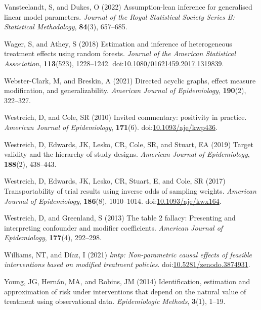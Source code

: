 \documentclass[
  single column]{article}
\newlength{\cslhangindent}
\newenvironment{CSLReferences}[2] %
 {\begin{list}{}{%
  \setlength{\itemindent}{0pt}
  \setlength{\leftmargin}{0pt}
  \setlength{\parsep}{0pt}
  \ifodd #1
   \setlength{\leftmargin}{\cslhangindent}
   \setlength{\itemindent}{-1\cslhangindent}
  \fi
  \setlength{\itemsep}{#2\baselineskip}}}
 {\end{list}}
\begin{document}
\begin{CSLReferences}{1}{0}
Vansteelandt, S, and Dukes, O (2022) Assumption-lean inference for
generalised linear model parameters. \emph{Journal of the Royal
Statistical Society Series B: Statistical Methodology}, \textbf{84}(3),
657--685.

Wager, S, and Athey, S (2018) Estimation and inference of heterogeneous
treatment effects using random forests. \emph{Journal of the American
Statistical Association}, \textbf{113}(523), 1228--1242.
doi:\href{https://doi.org/10.1080/01621459.2017.1319839}{10.1080/01621459.2017.1319839}.

Webster-Clark, M, and Breskin, A (2021) Directed acyclic graphs, effect
measure modification, and generalizability. \emph{American Journal of
Epidemiology}, \textbf{190}(2), 322--327.

Westreich, D, and Cole, SR (2010) Invited commentary: positivity in
practice. \emph{American Journal of Epidemiology}, \textbf{171}(6).
doi:\href{https://doi.org/10.1093/aje/kwp436}{10.1093/aje/kwp436}.

Westreich, D, Edwards, JK, Lesko, CR, Cole, SR, and Stuart, EA (2019)
Target validity and the hierarchy of study designs. \emph{American
Journal of Epidemiology}, \textbf{188}(2), 438--443.

Westreich, D, Edwards, JK, Lesko, CR, Stuart, E, and Cole, SR (2017)
Transportability of trial results using inverse odds of sampling
weights. \emph{American Journal of Epidemiology}, \textbf{186}(8),
1010--1014.
doi:\href{https://doi.org/10.1093/aje/kwx164}{10.1093/aje/kwx164}.

Westreich, D, and Greenland, S (2013) The table 2 fallacy: Presenting
and interpreting confounder and modifier coefficients. \emph{American
Journal of Epidemiology}, \textbf{177}(4), 292--298.

Williams, NT, and Díaz, I (2021) \emph{{l}mtp: Non-parametric causal
effects of feasible interventions based on modified treatment policies}.
doi:\href{https://doi.org/10.5281/zenodo.3874931}{10.5281/zenodo.3874931}.

Young, JG, Hernán, MA, and Robins, JM (2014) Identification, estimation
and approximation of risk under interventions that depend on the natural
value of treatment using observational data. \emph{Epidemiologic
Methods}, \textbf{3}(1), 1--19.

\end{CSLReferences}
\end{document}
